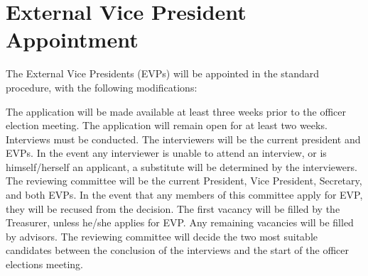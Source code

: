 \section{External Vice President Appointment} The External Vice Presidents (EVPs) will be appointed in the standard procedure, with the following modifications:
\begin{enumsubsection}
\itemnotoc The application will be made available at least three weeks prior to the officer election meeting.
\itemnotoc The application will remain open for at least two weeks.
\itemnotoc Interviews must be conducted. The interviewers will be the current president and EVPs. In the event any interviewer is unable to attend an interview, or is himself/herself an applicant, a substitute will be determined by the interviewers. 
\itemnotoc The reviewing committee will be the current President, Vice President, Secretary, and both EVPs. In the event that any members of this committee apply for EVP, they will be recused from the decision. The first vacancy will be filled by the Treasurer, unless he/she applies for EVP. Any remaining vacancies will be filled by advisors. 
\itemnotoc The reviewing committee will decide the two most suitable candidates between the conclusion of the interviews and the start of the officer elections meeting.
\end{enumsubsection}

